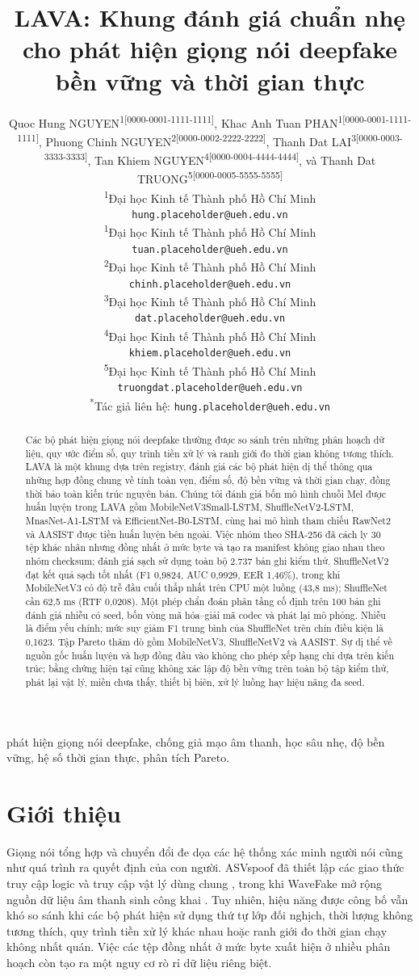 \documentclass[10pt,journal,onecolumn,a4paper]{IEEEtran}
\title{LAVA: Khung đánh giá chuẩn nhẹ cho phát hiện giọng nói deepfake bền vững và thời gian thực}
\author{%
\parbox{0.96\textwidth}{\centering
Quoc Hung NGUYEN\textsuperscript{1[0000-0001-1111-1111]},
Khac Anh Tuan PHAN\textsuperscript{1[0000-0001-1111-1111]},
Phuong Chinh NGUYEN\textsuperscript{2[0000-0002-2222-2222]},
Thanh Dat LAI\textsuperscript{3[0000-0003-3333-3333]},
Tan Khiem NGUYEN\textsuperscript{4[0000-0004-4444-4444]}, và
Thanh Dat TRUONG\textsuperscript{5[0000-0005-5555-5555]}

\par\vspace{1em}

\textsuperscript{1}Đại học Kinh tế Thành phố Hồ Chí Minh\\
\texttt{hung.placeholder@ueh.edu.vn}\\[0.35em]

\textsuperscript{1}Đại học Kinh tế Thành phố Hồ Chí Minh\\
\texttt{tuan.placeholder@ueh.edu.vn}\\[0.35em]

\textsuperscript{2}Đại học Kinh tế Thành phố Hồ Chí Minh\\
\texttt{chinh.placeholder@ueh.edu.vn}\\[0.35em]

\textsuperscript{3}Đại học Kinh tế Thành phố Hồ Chí Minh\\
\texttt{dat.placeholder@ueh.edu.vn}\\[0.35em]

\textsuperscript{4}Đại học Kinh tế Thành phố Hồ Chí Minh\\
\texttt{khiem.placeholder@ueh.edu.vn}\\[0.35em]

\textsuperscript{5}Đại học Kinh tế Thành phố Hồ Chí Minh\\
\texttt{truongdat.placeholder@ueh.edu.vn}

\par\vspace{0.4em}

\textsuperscript{*}Tác giả liên hệ:
\texttt{hung.placeholder@ueh.edu.vn}
}}
\begin{document}
\maketitle
\begin{abstract}
Các bộ phát hiện giọng nói deepfake thường được so sánh trên những phân hoạch dữ liệu, quy ước điểm số, quy trình tiền xử lý và ranh giới đo thời gian không tương thích. LAVA là một khung dựa trên registry, đánh giá các bộ phát hiện dị thể thông qua những hợp đồng chung về tính toàn vẹn, điểm số, độ bền vững và thời gian chạy, đồng thời bảo toàn kiến trúc nguyên bản. Chúng tôi đánh giá bốn mô hình chuỗi Mel được huấn luyện trong LAVA gồm MobileNetV3Small-LSTM, ShuffleNetV2-LSTM, MnasNet-A1-LSTM và EfficientNet-B0-LSTM, cùng hai mô hình tham chiếu RawNet2 và AASIST được tiền huấn luyện bên ngoài. Việc nhóm theo SHA-256 đã cách ly 30 tệp khác nhãn nhưng đồng nhất ở mức byte và tạo ra manifest không giao nhau theo nhóm checksum; đánh giá sạch sử dụng toàn bộ 2.737 bản ghi kiểm thử. ShuffleNetV2 đạt kết quả sạch tốt nhất (F1 0,9824, AUC 0,9929, EER 1,46\%), trong khi MobileNetV3 có độ trễ đầu cuối thấp nhất trên CPU một luồng (43,8 ms); ShuffleNet cần 62,5 ms (RTF 0,0208). Một phép chẩn đoán phân tầng cố định trên 100 bản ghi đánh giá nhiễu có seed, bốn vòng mã hóa--giải mã codec và phát lại mô phỏng. Nhiễu là điểm yếu chính; mức suy giảm F1 trung bình của ShuffleNet trên chín điều kiện là 0,1623. Tập Pareto thăm dò gồm MobileNetV3, ShuffleNetV2 và AASIST. Sự dị thể về nguồn gốc huấn luyện và hợp đồng đầu vào không cho phép xếp hạng chỉ dựa trên kiến trúc; bằng chứng hiện tại cũng không xác lập độ bền vững trên toàn bộ tập kiểm thử, phát lại vật lý, miền chưa thấy, thiết bị biên, xử lý luồng hay hiệu năng đa seed.
\end{abstract}
\begin{IEEEkeywords}phát hiện giọng nói deepfake, chống giả mạo âm thanh, học sâu nhẹ, độ bền vững, hệ số thời gian thực, phân tích Pareto.
\end{IEEEkeywords}

\section{Giới thiệu}
Giọng nói tổng hợp và chuyển đổi đe dọa các hệ thống xác minh người nói cũng như quá trình ra quyết định của con người. ASVspoof đã thiết lập các giao thức truy cập logic và truy cập vật lý dùng chung \cite{wu2015asvspoof,kinnunen2017asvspoof,todisco2019asvspoof,yamagishi2021asvspoof,kinnunen2018tdcf}, trong khi WaveFake mở rộng nguồn dữ liệu âm thanh sinh công khai \cite{frank2021wavefake}. Tuy nhiên, hiệu năng được công bố vẫn khó so sánh khi các bộ phát hiện sử dụng thứ tự lớp đối nghịch, thời lượng không tương thích, quy trình tiền xử lý khác nhau hoặc ranh giới đo thời gian chạy không nhất quán. Việc các tệp đồng nhất ở mức byte xuất hiện ở nhiều phân hoạch còn tạo ra một nguy cơ rò rỉ dữ liệu riêng biệt.
\end{document}
